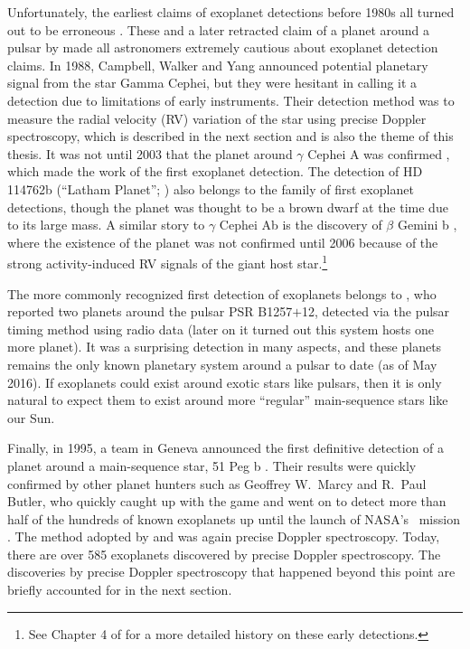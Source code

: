 Unfortunately, the earliest claims of exoplanet detections before
1980s all turned out to be erroneous \citep{1855MNRAS..15..228J,
1969AJ.....74..757V}. These and a later retracted claim of a planet
around a pulsar by \cite{1991Natur.352..311B} made all astronomers
extremely cautious about exoplanet detection claims. In 1988,
Campbell, Walker and Yang announced potential planetary signal from
the star Gamma Cephei, but they were hesitant in calling it a
detection due to limitations of early instruments. Their detection
method was to measure the radial velocity (RV) variation of the star
using precise Doppler spectroscopy, which is described in the next
section and is also the theme of this thesis.  It was not until 2003
that the planet around $\gamma$ Cephei A was confirmed
\citep{2003ApJ...599.1383H}, which made the work of
\cite{1988ApJ...331..902C} the first exoplanet detection. The
detection of HD 114762b (``Latham Planet'';
\citealt{1989Natur.339...38L}) also belongs to the family of first
exoplanet detections, though the planet was thought to be a brown
dwarf at the time due to its large mass. A similar story to $\gamma$
Cephei Ab is the discovery of $\beta$ Gemini b
\citep{1993ApJ...413..339H}, where the existence of the planet was not
confirmed until 2006 \citep{2006A&A...457..335H} because of the strong
activity-induced RV signals of the giant host star.\footnote{See
  Chapter 4 of \cite{2013pss3.book..489W} for a more detailed history
  on these early detections.} 

The more commonly recognized first detection of exoplanets belongs to
\cite{1992Natur.355..145W}, who reported two planets around the pulsar
PSR B1257$+$12, detected via the pulsar timing method using radio data
(later on it turned out this system hosts one more planet). It was a
surprising detection in many aspects, and these planets remains the
only known planetary system around a pulsar to date (as of May
2016). If exoplanets could exist around exotic stars like pulsars,
then it is only natural to expect them to exist around more
``regular'' main-sequence stars like our Sun.

Finally, in 1995, a team in Geneva announced the first definitive
detection of a planet around a main-sequence star, 51 Peg b
\citep{1995Natur.378..355M}. Their results were quickly confirmed by
other planet hunters such as Geoffrey W.\ Marcy and R.\ Paul Butler,
who quickly caught up with the game \citep{1996ApJ...464L.153B} and
went on to detect more than half of the hundreds of known exoplanets
up until the launch of NASA's \kepler\ mission
\cite{2010Sci...327..977B}. The method adopted by
\cite{1995Natur.378..355M} and \cite{1996ApJ...464L.153B} was again
precise Doppler spectroscopy. Today, there are over 585 exoplanets
discovered by precise Doppler spectroscopy. The discoveries by precise
Doppler spectroscopy that happened beyond this point are briefly
accounted for in the next section. 

